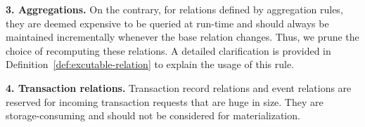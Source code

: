 \noindent \textbf{3. Aggregations.} 
On the contrary, for relations defined by aggregation rules, they are deemed expensive to be queried at run-time and should always be maintained incrementally whenever the base relation changes. Thus, we prune the choice of recomputing these relations. A detailed clarification is provided in Definition~\ref{def:excutable-relation} to explain the usage of this rule.

\noindent \textbf{4. Transaction relations.} 
Transaction record relations and event relations are reserved for incoming transaction requests that are huge in size. They are storage-consuming and should not be considered for materialization.